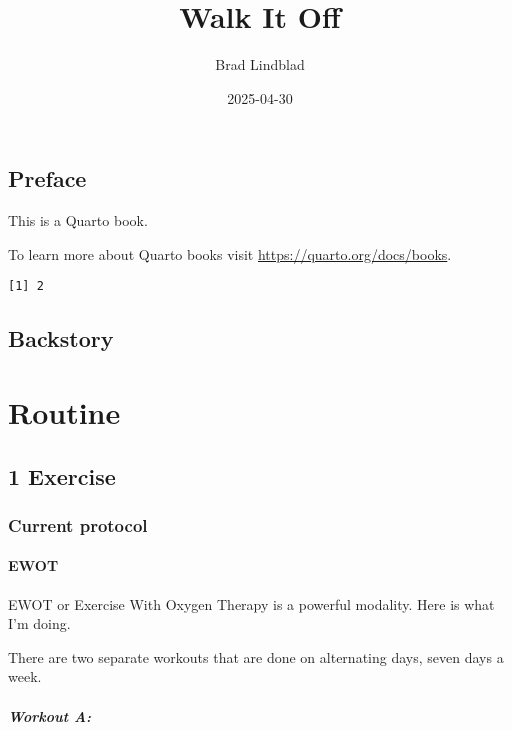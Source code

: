 \documentclass[
  letterpaper,
  DIV=11,
  numbers=noendperiod]{scrreprt}
\title{Walk It Off}
\author{Brad Lindblad}
\date{2025-04-30}
\renewcommand*\contentsname{Table of contents}
\newcommand\contentsname{Table of contents}
\begin{document}
\maketitle

\renewcommand*\contentsname{Table of contents}
{
\hypersetup{linkcolor=}
\setcounter{tocdepth}{2}
\tableofcontents
}

\chapter*{Preface}\label{preface}


This is a Quarto book.

To learn more about Quarto books visit
\url{https://quarto.org/docs/books}.

\begin{verbatim}
[1] 2
\end{verbatim}


\chapter{Backstory}\label{backstory}

\part{Routine}

\chapter{1 Exercise}\label{exercise}

\section{Current protocol}\label{current-protocol}

\subsection{EWOT}\label{ewot}

EWOT or Exercise With Oxygen Therapy is a powerful modality. Here is
what I'm doing.

There are two separate workouts that are done on alternating days, seven
days a week.

\subsubsection{Workout A:}\label{workout-a}
\end{document}
